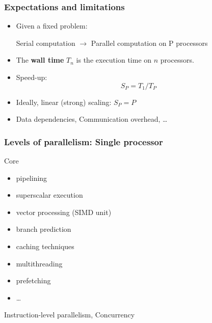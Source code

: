 \begin{frame}
  \frametitle{Expectations and limitations}

\begin{itemize}
\item Given a fixed problem:
\begin{center}
Serial computation $\rightarrow$ Parallel computation on P processors
\end{center}

\vspace{2ex}
\item The \textbf{wall time} $T_n$ is the execution time on $n$ processors. 

\vspace{2ex}
\item Speed-up:
\begin{equation*}
S_P = T_1 / T_P
\end{equation*}

\vspace{2ex}

\item Ideally, linear (strong) scaling: $S_P = P$

\vspace{2ex}

\item Data dependencies, Communication overhead, \dots
\end{itemize}

\end{frame}

\begin{frame}
  \frametitle{Levels of parallelism: Single processor}

Core
\begin{itemize}
\item pipelining
\item superscalar execution
\item vector processing (SIMD unit)
\item branch prediction
\item caching techniques
\item multithreading
\item prefetching
\item \dots
\end{itemize}
\begin{center}
Instruction-level parallelism, Concurrency
\end{center}

\end{frame}


